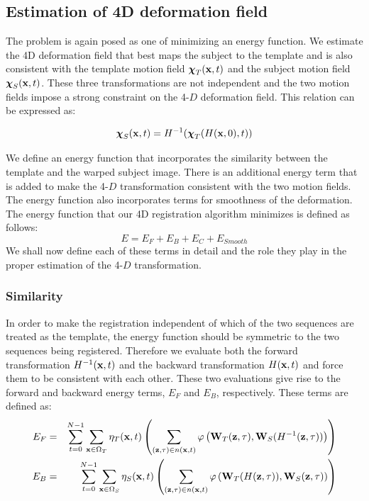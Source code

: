 \subsection{Estimation of 4D deformation field }

The problem is again posed as one of minimizing an energy function. We estimate the 4D deformation field that best maps the subject to the template and is also consistent with the template motion field ${\boldsymbol{\chi}}_T ( \mathbf{x}, t )$ and the subject motion field ${\boldsymbol{\chi}}_S ( \mathbf{x}, t )$. These three transformations are not independent and the two motion fields impose a strong constraint on the 4-$D$ deformation field. This relation can be expressed as:

\begin{equation}
\label{eq:4d-mot-rel}
{\boldsymbol{\chi}}_S ( \mathbf{x}, t ) = H^{-1} ( {\boldsymbol{\chi}}_T ( H (\mathbf{x}, 0 ), t ) )
\end{equation}

We define an energy function that incorporates the similarity between the template and the warped subject image. There is an additional energy term that is added to make the 4-$D$ transformation consistent with the two motion fields. The energy function also incorporates terms for smoothness of the deformation. The energy function that our 4D registration algorithm minimizes is defined as follows:
\begin{equation}
	E = E_F + E_B + E_C + E_{Smooth}
\end{equation}
We shall now define each of these terms in detail and the role they play in the proper estimation of the 4-$D$ transformation.

\subsubsection{Similarity}
In order to make the registration independent of which of the two sequences are treated as the template, the energy function should be symmetric to the two sequences being registered. Therefore we evaluate both the forward transformation $H^{-1} ( \mathbf{x}, t )$ and the backward transformation $H ( \mathbf{x}, t )$ and force them to be consistent with each other. These two evaluations give rise to the forward and backward energy terms, $E_F$ and $E_B$, respectively. These terms are defined as:
\begin{eqnarray}
  E_F &=& \sum_{t = 0}^{N - 1} \sum_{\mathbf{x} \in \Omega_T }
  \eta_T ( \mathbf{x}, t ) \left( \sum_{( \mathbf{z}, \tau ) \in n ( \mathbf{x}, t
  )} \varphi \left( \mathbf{W}_T ( \mathbf{z}, \tau ), \mathbf{W}_S ( H^{-1} ( \mathbf{z}, \tau
  ) ) \right) \right) \\
  E_B &=& \sum_{t = 0}^{N - 1} \sum_{\mathbf{x} \in \Omega_S }
   \eta_S ( \mathbf{x}, t ) \left( \sum_{( \mathbf{z}, \tau ) \in n ( \mathbf{x},
   t )} \varphi \left( \mathbf{W}_T ( H ( \mathbf{z}, \tau ) ), \mathbf{W}_S ( \mathbf{z},
   \tau ) \right) \right)  
\end{eqnarray}
   
